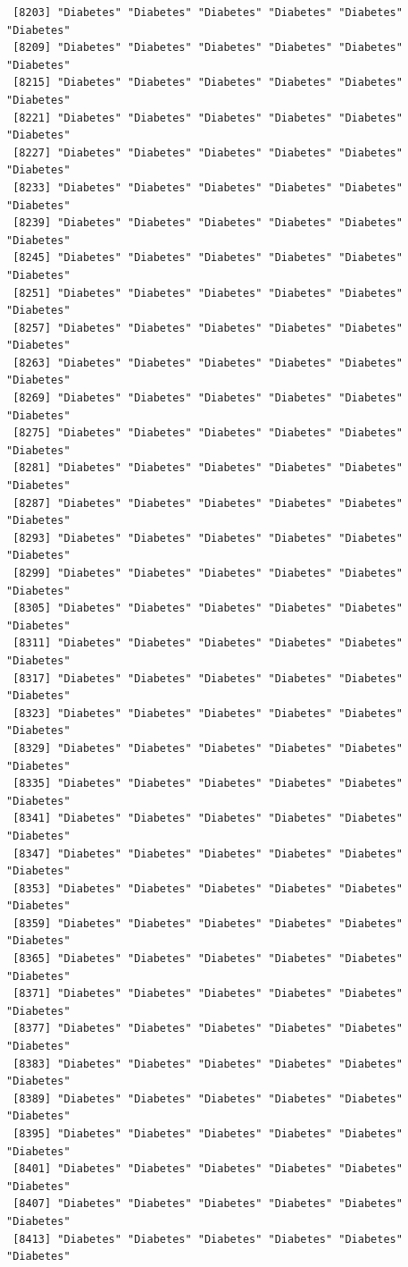 \documentclass[
  letterpaper,
  DIV=11,
  numbers=noendperiod]{scrartcl}
\begin{document}
\begin{verbatim}
 [8203] "Diabetes" "Diabetes" "Diabetes" "Diabetes" "Diabetes" "Diabetes"
 [8209] "Diabetes" "Diabetes" "Diabetes" "Diabetes" "Diabetes" "Diabetes"
 [8215] "Diabetes" "Diabetes" "Diabetes" "Diabetes" "Diabetes" "Diabetes"
 [8221] "Diabetes" "Diabetes" "Diabetes" "Diabetes" "Diabetes" "Diabetes"
 [8227] "Diabetes" "Diabetes" "Diabetes" "Diabetes" "Diabetes" "Diabetes"
 [8233] "Diabetes" "Diabetes" "Diabetes" "Diabetes" "Diabetes" "Diabetes"
 [8239] "Diabetes" "Diabetes" "Diabetes" "Diabetes" "Diabetes" "Diabetes"
 [8245] "Diabetes" "Diabetes" "Diabetes" "Diabetes" "Diabetes" "Diabetes"
 [8251] "Diabetes" "Diabetes" "Diabetes" "Diabetes" "Diabetes" "Diabetes"
 [8257] "Diabetes" "Diabetes" "Diabetes" "Diabetes" "Diabetes" "Diabetes"
 [8263] "Diabetes" "Diabetes" "Diabetes" "Diabetes" "Diabetes" "Diabetes"
 [8269] "Diabetes" "Diabetes" "Diabetes" "Diabetes" "Diabetes" "Diabetes"
 [8275] "Diabetes" "Diabetes" "Diabetes" "Diabetes" "Diabetes" "Diabetes"
 [8281] "Diabetes" "Diabetes" "Diabetes" "Diabetes" "Diabetes" "Diabetes"
 [8287] "Diabetes" "Diabetes" "Diabetes" "Diabetes" "Diabetes" "Diabetes"
 [8293] "Diabetes" "Diabetes" "Diabetes" "Diabetes" "Diabetes" "Diabetes"
 [8299] "Diabetes" "Diabetes" "Diabetes" "Diabetes" "Diabetes" "Diabetes"
 [8305] "Diabetes" "Diabetes" "Diabetes" "Diabetes" "Diabetes" "Diabetes"
 [8311] "Diabetes" "Diabetes" "Diabetes" "Diabetes" "Diabetes" "Diabetes"
 [8317] "Diabetes" "Diabetes" "Diabetes" "Diabetes" "Diabetes" "Diabetes"
 [8323] "Diabetes" "Diabetes" "Diabetes" "Diabetes" "Diabetes" "Diabetes"
 [8329] "Diabetes" "Diabetes" "Diabetes" "Diabetes" "Diabetes" "Diabetes"
 [8335] "Diabetes" "Diabetes" "Diabetes" "Diabetes" "Diabetes" "Diabetes"
 [8341] "Diabetes" "Diabetes" "Diabetes" "Diabetes" "Diabetes" "Diabetes"
 [8347] "Diabetes" "Diabetes" "Diabetes" "Diabetes" "Diabetes" "Diabetes"
 [8353] "Diabetes" "Diabetes" "Diabetes" "Diabetes" "Diabetes" "Diabetes"
 [8359] "Diabetes" "Diabetes" "Diabetes" "Diabetes" "Diabetes" "Diabetes"
 [8365] "Diabetes" "Diabetes" "Diabetes" "Diabetes" "Diabetes" "Diabetes"
 [8371] "Diabetes" "Diabetes" "Diabetes" "Diabetes" "Diabetes" "Diabetes"
 [8377] "Diabetes" "Diabetes" "Diabetes" "Diabetes" "Diabetes" "Diabetes"
 [8383] "Diabetes" "Diabetes" "Diabetes" "Diabetes" "Diabetes" "Diabetes"
 [8389] "Diabetes" "Diabetes" "Diabetes" "Diabetes" "Diabetes" "Diabetes"
 [8395] "Diabetes" "Diabetes" "Diabetes" "Diabetes" "Diabetes" "Diabetes"
 [8401] "Diabetes" "Diabetes" "Diabetes" "Diabetes" "Diabetes" "Diabetes"
 [8407] "Diabetes" "Diabetes" "Diabetes" "Diabetes" "Diabetes" "Diabetes"
 [8413] "Diabetes" "Diabetes" "Diabetes" "Diabetes" "Diabetes" "Diabetes"

\end{verbatim}
\end{document}

